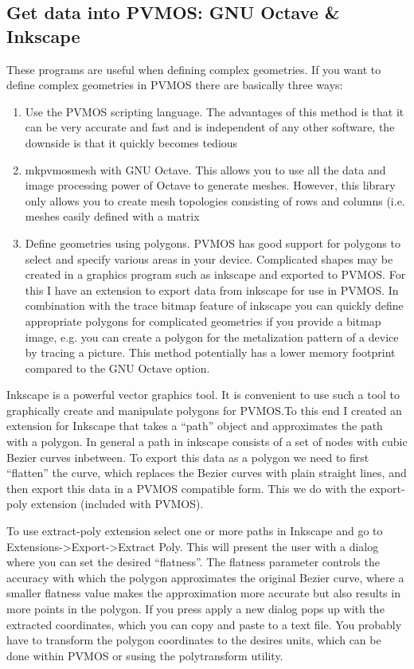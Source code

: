 \documentclass[noshowpacs,preprintnumbers,amsmath,amssymb, letter]{revtex4}
\begin{document}
\subsection{Get data into PVMOS: GNU Octave \& Inkscape}
These programs are useful when defining complex geometries. If you want to define complex geometries in PVMOS there are basically three ways:
\begin{enumerate}
\item{} Use the PVMOS scripting language. The advantages of this method is that it can be very accurate and fast and is independent of any other software, the downside is that it quickly becomes tedious
\item{} mkpvmosmesh with GNU Octave. This allows you to use all the data and image processing power of Octave to generate meshes. However, this library only allows you to create mesh topologies consisting of rows and columns (i.e. meshes easily defined with a matrix
\item{} Define geometries using polygons. PVMOS has good support for polygons to select and specify various areas in your device. Complicated shapes may be created in a graphics program such as inkscape and exported to PVMOS. For this I have an extension to export data from inkscape for use in PVMOS. In combination with the trace bitmap feature of inkscape you can quickly define appropriate polygons for complicated geometries if you provide a bitmap image, e.g. you can create a polygon for the metalization pattern of a device by tracing a picture. This method potentially has a lower memory footprint compared to the GNU Octave option. 
\end{enumerate}   

Inkscape is a powerful vector graphics tool. It is convenient to use such a tool to graphically create and manipulate polygons for PVMOS.To this end I created an extension for Inkscape that takes a ``path'' object and approximates the path with a polygon. In general a path in inkscape consists of a set of nodes with cubic Bezier curves inbetween. To export this data as a polygon we need to first ``flatten'' the curve, which replaces the Bezier curves with plain straight lines, and then export this data in a PVMOS compatible form. This we do with the export-poly extension (included with PVMOS). 

To use extract-poly extension select one or more paths in Inkscape and go to Extensions->Export->Extract Poly. This will present the user with a dialog where you can set the desired ``flatness''. The flatness parameter controls the accuracy with which the polygon approximates the original Bezier curve, where a smaller flatness value makes the approximation more accurate but also results in more points in the polygon. If you press apply a new dialog pops up with the extracted coordinates, which you can copy and paste to a text file. You probably have to transform the polygon coordinates to the desires units, which can be done within PVMOS or susing the polytransform utility.
\end{document}
